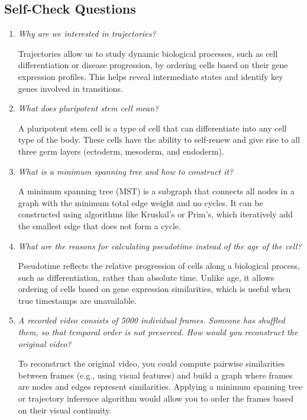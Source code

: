 \documentclass[a4paper]{article}
\begin{document}
\subsection*{Self-Check Questions}

\begin{enumerate}

    \item \textit{Why are we interested in trajectories?}  
    
    Trajectories allow us to study dynamic biological processes, such as cell differentiation or disease progression, by ordering cells based on their gene expression profiles.  
    This helps reveal intermediate states and identify key genes involved in transitions.  

    \item \textit{What does pluripotent stem cell mean?}  
    
    A pluripotent stem cell is a type of cell that can differentiate into any cell type of the body.  
    These cells have the ability to self-renew and give rise to all three germ layers (ectoderm, mesoderm, and endoderm).  

    \item \textit{What is a minimum spanning tree and how to construct it?}  
    
    A minimum spanning tree (MST) is a subgraph that connects all nodes in a graph with the minimum total edge weight and no cycles.  
    It can be constructed using algorithms like Kruskal's or Prim's, which iteratively add the smallest edge that does not form a cycle.  

    \item \textit{What are the reasons for calculating pseudotime instead of the age of the cell?}  
    
    Pseudotime reflects the relative progression of cells along a biological process, such as differentiation, rather than absolute time.  
    Unlike age, it allows ordering of cells based on gene expression similarities, which is useful when true timestamps are unavailable.  

    \item \textit{A recorded video consists of 5000 individual frames. Someone has shuffled them, so that temporal order is not preserved. How would you reconstruct the original video?}  
    
    To reconstruct the original video, you could compute pairwise similarities between frames (e.g., using visual features) and build a graph where frames are nodes and edges represent similarities.  
    Applying a minimum spanning tree or trajectory inference algorithm would allow you to order the frames based on their visual continuity.  

\end{enumerate}
\end{document}
